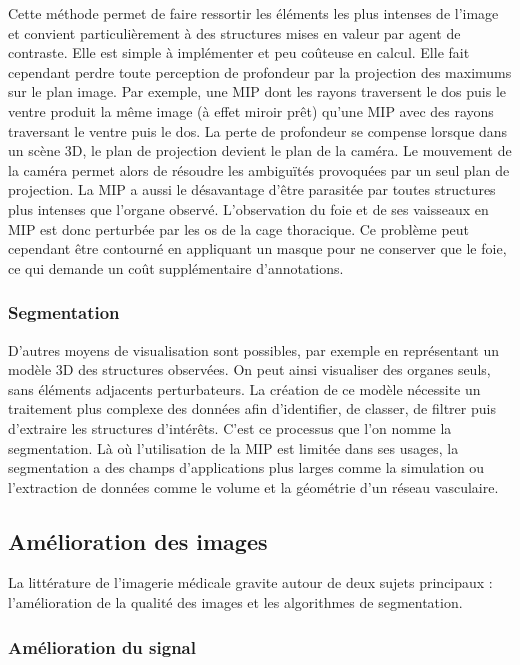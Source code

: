       Cette méthode permet de faire ressortir les éléments les plus intenses de l'image et convient particulièrement à des structures mises en valeur par agent de contraste. Elle est simple à implémenter et peu coûteuse en calcul. Elle fait cependant perdre toute perception de profondeur par la projection des maximums sur le plan image. Par exemple, une MIP dont les rayons traversent le dos puis le ventre produit la même image (à effet miroir prêt) qu'une MIP avec des rayons traversant le ventre puis le dos. La perte de profondeur se compense lorsque dans un scène 3D, le plan de projection devient le plan de la caméra. Le mouvement de la caméra permet alors de résoudre les ambiguïtés provoquées par un seul plan de projection. 
      La MIP a aussi le désavantage d'être parasitée par toutes structures plus intenses que l'organe observé. L'observation du foie et de ses vaisseaux en MIP est donc perturbée par les os de la cage thoracique. Ce problème peut cependant être contourné en appliquant un masque pour ne conserver que le foie, ce qui demande un coût supplémentaire d'annotations.

      \subsubsection{Segmentation}
      
      D'autres moyens de visualisation sont possibles, par exemple en représentant un modèle 3D des structures observées. On peut ainsi visualiser des organes seuls, sans éléments adjacents perturbateurs. La création de ce modèle nécessite un traitement plus complexe des données afin d'identifier, de classer, de filtrer puis d'extraire les structures d'intérêts. C'est ce processus que l'on nomme la segmentation. Là où l'utilisation de la MIP est limitée dans ses usages, la segmentation a des champs d'applications plus larges comme la simulation ou l'extraction de données comme le volume et la géométrie d'un réseau vasculaire.
  
  \subsection{Amélioration des images}
      La littérature de l'imagerie médicale gravite autour de deux sujets principaux : l'amélioration de la qualité des images et les algorithmes de segmentation.

    \subsubsection{Amélioration du signal}
      
